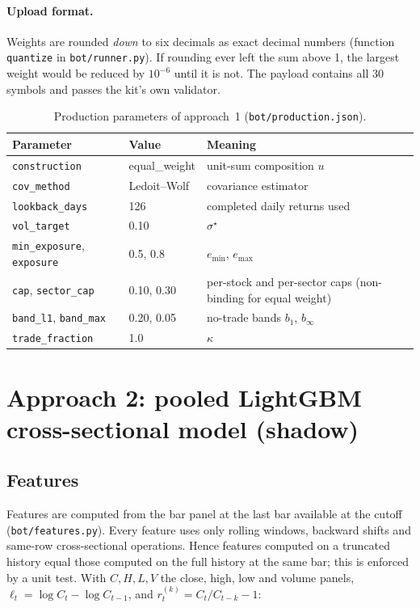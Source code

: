 \documentclass[11pt,a4paper]{article}
\newcommand{\code}[1]{\texttt{#1}}
\begin{document}
\paragraph{Upload format.} Weights are rounded \emph{down} to six decimals as exact decimal numbers
(function \code{quantize} in \code{bot/runner.py}). If
rounding ever left the sum above 1, the largest weight would be reduced by $10^{-6}$ until it is not. The payload contains
all 30 symbols and passes the kit's own validator.

\begin{table}[h]
\centering\small
\begin{tabularx}{\linewidth}{llX}
\toprule
Parameter & Value & Meaning \\
\midrule
\code{construction} & equal\_weight & unit-sum composition $u$ \\
\code{cov\_method} & Ledoit--Wolf & covariance estimator \\
\code{lookback\_days} & 126 & completed daily returns used \\
\code{vol\_target} & 0.10 & $\sigma^\star$ \\
\code{min\_exposure}, \code{exposure} & 0.5, 0.8 & $e_{\min}$, $e_{\max}$ \\
\code{cap}, \code{sector\_cap} & 0.10, 0.30 & per-stock and per-sector caps (non-binding for equal weight) \\
\code{band\_l1}, \code{band\_max} & 0.20, 0.05 & no-trade bands $b_1$, $b_\infty$ \\
\code{trade\_fraction} & 1.0 & $\kappa$ \\
\bottomrule
\end{tabularx}
\caption{Production parameters of approach~1 (\code{bot/production.json}).}
\label{tab:params}
\end{table}

\section{Approach 2: pooled LightGBM cross-sectional model (shadow)}\label{sec:alpha}

\subsection{Features}
Features are computed from the bar panel at the last bar available at the cutoff (\code{bot/features.py}). Every
feature uses only rolling windows, backward shifts and same-row cross-sectional operations. Hence features computed on
a truncated history equal those computed on the full history at the same bar; this is enforced by a unit test.
With $C,H,L,V$ the close, high, low and volume panels, $\ell_t=\log C_t-\log C_{t-1}$, and $r^{(k)}_t=C_t/C_{t-k}-1$:
\end{document}
